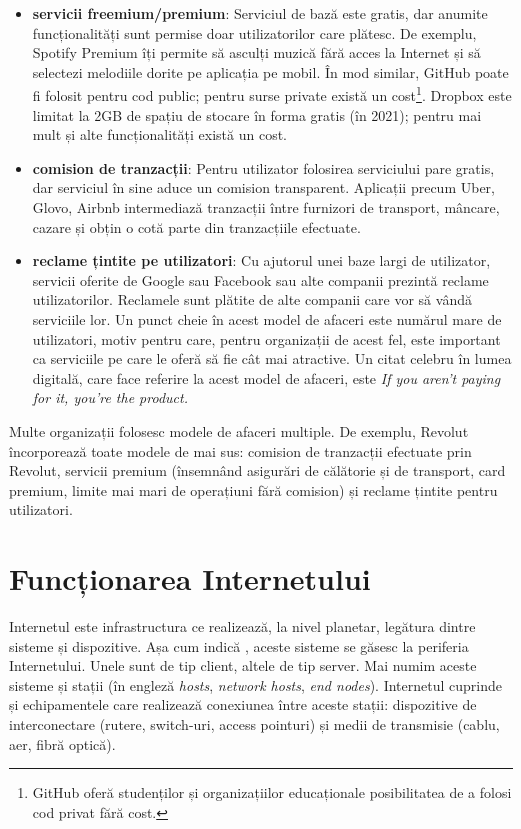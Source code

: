 \begin{itemize}
  \item \textbf{servicii freemium/premium}:
    Serviciul de bază este gratis, dar anumite funcționalități sunt permise doar utilizatorilor care plătesc.
    De exemplu, Spotify Premium îți permite să asculți muzică fără acces la Internet și să selectezi melodiile dorite pe aplicația pe mobil.
    În mod similar, GitHub poate fi folosit pentru cod public; pentru surse private există un cost\footnote{GitHub oferă studenților și organizațiilor educaționale posibilitatea de a folosi cod privat fără cost.}.
    Dropbox este limitat la 2GB de spațiu de stocare în forma gratis (în 2021); pentru mai mult și alte funcționalități există un cost.
  \item \textbf{comision de tranzacții}:
    Pentru utilizator folosirea serviciului pare gratis, dar serviciul în sine aduce un comision transparent.
    Aplicații precum Uber, Glovo, Airbnb intermediază tranzacții între furnizori de transport, mâncare, cazare și obțin o cotă parte din tranzacțiile efectuate.
  \item \textbf{reclame țintite pe utilizatori}:
    Cu ajutorul unei baze largi de utilizator, servicii oferite de Google sau Facebook sau alte companii prezintă reclame utilizatorilor.
    Reclamele sunt plătite de alte companii care vor să vândă serviciile lor.
    Un punct cheie în acest model de afaceri este numărul mare de utilizatori, motiv pentru care, pentru organizații de acest fel, este important ca serviciile pe care le oferă să fie cât mai atractive.
    Un citat celebru în lumea digitală, care face referire la acest model de afaceri, este \textit{If you aren't paying for it, you're the product.}
\end{itemize}

Multe organizații folosesc modele de afaceri multiple.
De exemplu, Revolut încorporează toate modele de mai sus: comision de tranzacții efectuate prin Revolut, servicii premium (însemnând asigurări de călătorie și de transport, card premium, limite mai mari de operațiuni fără comision) și reclame țintite pentru utilizatori.

\section{Funcționarea Internetului}
\label{sec:net:internet}

Internetul este infrastructura ce realizează, la nivel planetar, legătura dintre sisteme și dispozitive.
Așa cum indică , aceste sisteme se găsesc la periferia Internetului.
Unele sunt de tip client, altele de tip server.
Mai numim aceste sisteme și stații (în engleză \textit{hosts}, \textit{network hosts}, \textit{end nodes}).
Internetul cuprinde și echipamentele care realizează conexiunea între aceste stații: dispozitive de interconectare (rutere, switch-uri, access pointuri) și medii de transmisie (cablu, aer, fibră optică).

